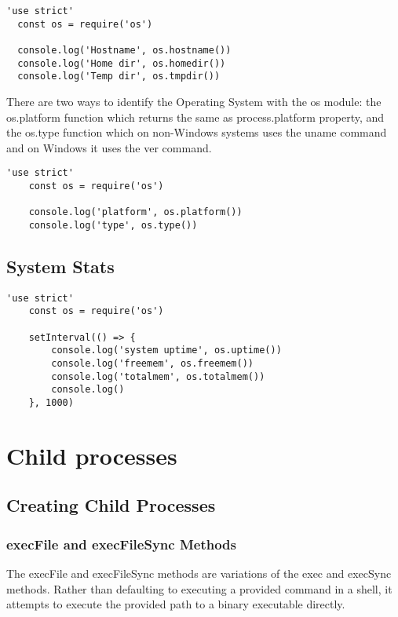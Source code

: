 \documentclass{scrartcl}
\begin{document}
\begin{lstlisting}[style=ES6]
  'use strict'
  const os = require('os')

  console.log('Hostname', os.hostname())
  console.log('Home dir', os.homedir())
  console.log('Temp dir', os.tmpdir())
\end{lstlisting}

There are two ways to identify the Operating System with the os module: the os.platform function which returns the same as process.platform property, and the os.type function which on non-Windows systems uses the uname command and on Windows it uses the ver command.

\begin{lstlisting}[style=ES6]
    'use strict'
    const os = require('os')

    console.log('platform', os.platform())
    console.log('type', os.type())
\end{lstlisting}

\subsection{System Stats}

\begin{lstlisting}[style=ES6]
    'use strict'
    const os = require('os')

    setInterval(() => {
        console.log('system uptime', os.uptime())
        console.log('freemem', os.freemem())
        console.log('totalmem', os.totalmem())
        console.log()
    }, 1000)
\end{lstlisting}

\section{Child processes}

\subsection{Creating Child Processes}

\subsubsection{execFile and execFileSync Methods}

The execFile and execFileSync methods are variations of the exec and execSync methods. Rather than defaulting to executing a provided command in a shell, it attempts to execute the provided path to a binary executable directly.
\end{document}
